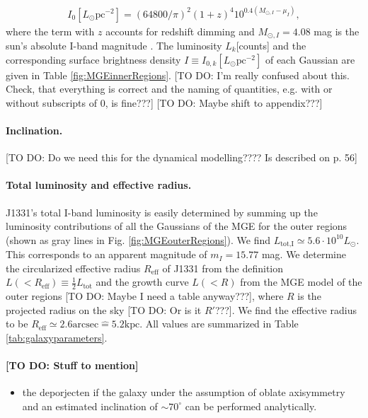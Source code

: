 \begin{eqnarray*}
I_0[L_\odot \text{pc}^{-2}] = \left( 64800/\pi\right)^2 \left(1+z \right)^4 10^{0.4\left(M_{\odot,I}-\mu_I \right)},
\end{eqnarray*}
where the term with $z$ accounts for redshift dimming and $M_{\odot,I}=4.08$ mag is the sun's absolute I-band magnitude \citep{1998gaas.book.....B}. The luminosity $L_k$[counts] and the corresponding surface brightness density $I \equiv I_{0,k}[L_\odot \text{pc}^{-2}]$ of each Gaussian are given in Table \ref{fig:MGEinnerRegions}. [TO DO: I'm really confused about this. Check, that everything is correct and the naming of quantities, e.g. with or without subscripts of 0, is fine???] [TO DO: Maybe shift to appendix???]

\paragraph{Inclination.} [TO DO: Do we need this for the dynamical modelling???? Is described on p. 56]

\paragraph{Total luminosity and effective radius.} J1331's total I-band luminosity is easily determined by summing up the luminosity contributions of all the Gaussians of the MGE for the outer regions (shown as gray lines in Fig. \ref{fig:MGEouterRegions}). We find $L_\text{tot,I} \simeq 5.6 \cdot 10^{10} L_\odot$. This corresponds to an apparent magnitude of $m_I = 15.77$ mag. We determine the circularized effective radius $R_\text{eff}$ of J1331 from the definition $L(<R_\text{eff}) \equiv \frac 12 L_\text{tot}$ and the growth curve $L(<R)$ from the MGE model of the outer regions [TO DO: Maybe I need a table anyway???], where $R$ is the projected radius on the sky [TO DO: Or is it $R'$???]. We find the effective radius to be $R_\text{eff} \simeq 2.6 \text{arcsec} \hat{=} 5.2 \text{kpc}$.  All values are summarized in Table \ref{tab:galaxyparameters}.



\paragraph{[TO DO: Stuff to mention]}
\begin{itemize}
\item the deporjecten if the galaxy under the assumption of oblate axisymmetry and an estimated inclination of $\sim70^\circ$ can be performed analytically.
\end{itemize}


